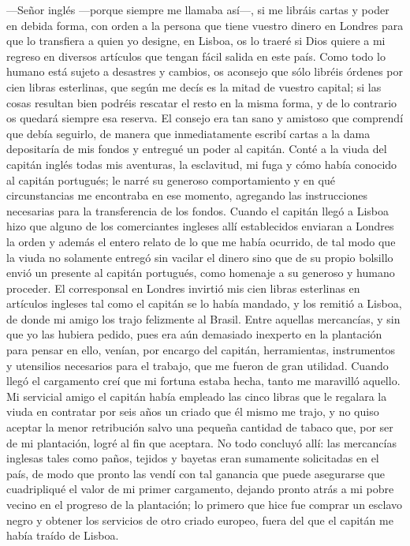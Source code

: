 \documentclass{novela}
\begin{document}
    —Señor inglés —porque siempre me llamaba así—, si me libráis cartas y poder en debida forma, con orden a la persona que tiene vuestro dinero en Londres para que lo transfiera a quien yo designe, en Lisboa, os lo traeré si Dios quiere a mi regreso en diversos artículos que tengan fácil salida en este país. Como todo lo humano está sujeto a desastres y cambios, os aconsejo que sólo libréis órdenes por cien libras esterlinas, que según me decís es la mitad de vuestro capital; si las cosas resultan bien podréis rescatar el resto en la misma forma, y de lo contrario os quedará siempre esa reserva.
    El consejo era tan sano y amistoso que comprendí que debía seguirlo, de manera que inmediatamente escribí cartas a la dama depositaría de mis fondos y entregué un poder al capitán. Conté a la viuda del capitán inglés todas mis aventuras, la esclavitud, mi fuga y cómo había conocido al capitán portugués; le narré su generoso comportamiento y en qué circunstancias me encontraba en ese momento, agregando las instrucciones necesarias para la transferencia de los fondos. Cuando el capitán llegó a Lisboa hizo que alguno de los comerciantes ingleses allí establecidos enviaran a Londres la orden y además el entero relato de lo que me había ocurrido, de tal modo que la viuda no solamente entregó sin vacilar el dinero sino que de su propio bolsillo envió un presente al capitán portugués, como homenaje a su generoso y humano proceder.
    El corresponsal en Londres invirtió mis cien libras esterlinas en artículos ingleses tal como el capitán se lo había mandado, y los remitió a Lisboa, de donde mi amigo los trajo felizmente al Brasil. Entre aquellas mercancías, y sin que yo las hubiera pedido, pues era aún demasiado inexperto en la plantación para pensar en ello, venían, por encargo del capitán, herramientas, instrumentos y utensilios necesarios para el trabajo, que me fueron de gran utilidad.
    Cuando llegó el cargamento creí que mi fortuna estaba hecha, tanto me maravilló aquello. Mi servicial amigo el capitán había empleado las cinco libras que le regalara la viuda en contratar por seis años un criado que él mismo me trajo, y no quiso aceptar la menor retribución salvo una pequeña cantidad de tabaco que, por ser de mi plantación, logré al fin que aceptara.
    No todo concluyó allí: las mercancías inglesas tales como paños, tejidos y bayetas eran sumamente solicitadas en el país, de modo que pronto las vendí con tal ganancia que puede asegurarse que cuadripliqué el valor de mi primer cargamento, dejando pronto atrás a mi pobre vecino en el progreso de la plantación; lo primero que hice fue comprar un esclavo negro y obtener los servicios de otro criado europeo, fuera del que el capitán me había traído de Lisboa.
\end{document}
